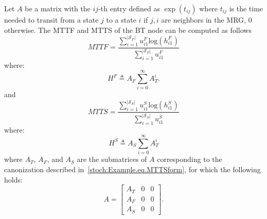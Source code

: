 \begin{lemma}
Let $A$ be a matrix with the $ij$-th entry defined as $\exp(t_{ij})$ where $t_{ij}$ is the time needed to transit from a state $j$ to a state $i$ if $j,i$ are neighbors in the MRG, $0$ otherwise. 
The MTTF and MTTS of the BT node can be computed as follows
\begin{equation}
MTTF=\frac{\sum_{i=1}^{\left\vert{\mathcal{S}_F}\right\vert} u^F_{i1}\mbox{log}(h^F_{i1})}{\sum_{i=1}^{\left\vert{\mathcal{S}_F}\right\vert}u^F_{i1}}
\label{stoch:main.eq.mttf}
\end{equation}
where:
\begin{equation} 
H^F\triangleq A_F \sum_{i=0}^{\infty} A_T^i.
\label{stoch:main.eq.hf}
\end{equation}
and
\begin{equation}
MTTS=\frac{\sum_{i=1}^{\left\vert{\mathcal{S}_S}\right\vert} u^S_{i1}\mbox{log}(h^S_{i1})}{\sum_{i=1}^{\left\vert{\mathcal{S}_S}\right\vert}u^S_{i1}}
\label{stoch:main.eq.mtts}
\end{equation}
where:
\begin{equation} 
H^S \triangleq A_S \sum_{i=0}^{\infty} A_T^i
\label{stoch:main.eq.hs}
\end{equation}
where $A_T$, $A_F$, and $A_S$ are the submatrices of $A$ corresponding to the canonization described in~\eqref{stoch:Example.eq.MTTSform}, for which the following holds:
\begin{equation}
 A=\left[
\begin{array}{ccc}
A_T & {0}& {0} \\ 
A_F & {0} & {0} \\
A_S & {0} & {0} 
\end{array} \right].
\label{stoch:main.eq.A}
\end{equation}


\end{lemma}

